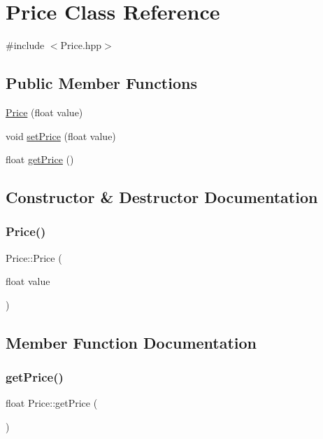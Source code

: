 \hypertarget{class_price}{}\section{Price Class Reference}
\label{class_price}


{\ttfamily \#include $<$Price.\+hpp$>$}

\subsection*{Public Member Functions}
\begin{DoxyCompactItemize}
\item 
\mbox{\hyperlink{class_price_a8b96acfdb91be413198c6c8d4487300e}{Price}} (float value)
\item 
void \mbox{\hyperlink{class_price_a66ba29e9ab95f10b5d21b171317045c3}{set\+Price}} (float value)
\item 
float \mbox{\hyperlink{class_price_af2ec5c04c31c740bb4c4d94c3891ecc2}{get\+Price}} ()
\end{DoxyCompactItemize}


\subsection{Constructor \& Destructor Documentation}
\mbox{\label{class_price_a8b96acfdb91be413198c6c8d4487300e}} 
\subsubsection{\texorpdfstring{Price()}{Price()}}
{\footnotesize\ttfamily Price\+::\+Price (\begin{DoxyParamCaption}\item[{float}]{value }\end{DoxyParamCaption})}



\subsection{Member Function Documentation}
\mbox{\label{class_price_af2ec5c04c31c740bb4c4d94c3891ecc2}} 
\subsubsection{\texorpdfstring{getPrice()}{getPrice()}}
{\footnotesize\ttfamily float Price\+::get\+Price (\begin{DoxyParamCaption}{ }\end{DoxyParamCaption})}

